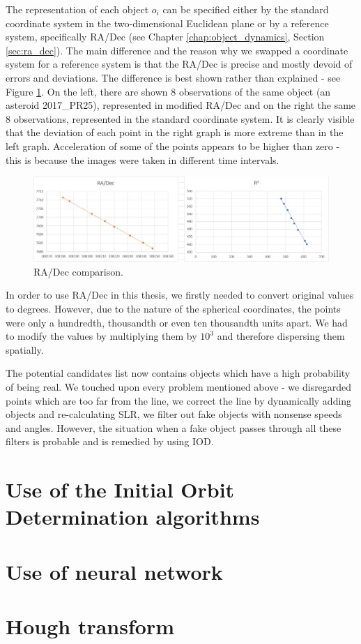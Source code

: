 	The representation of each object $o_i$ can be specified either by the standard coordinate system in the two-dimensional Euclidean plane or by a reference system, specifically RA/Dec (see Chapter \ref{chap:object_dynamics}, Section \ref{sec:ra_dec}). The main difference and the reason why we swapped  a coordinate system for a reference system is that the RA/Dec is precise and mostly devoid of errors and deviations. The difference is best shown rather than explained - see Figure \ref{fig:regresia3}. On the left, there are shown 8 observations of the same object (an asteroid 2017\_PR25), represented in modified RA/Dec and on the right the same 8 observations, represented in the standard coordinate system. It is clearly visible that the deviation of each point in the right graph is more extreme than in the left graph. Acceleration of some of the points appears to be higher than zero - this is because the images were taken in different time intervals.
	
	\begin{figure}[H]
	\centering
	  \includegraphics[width=12cm]{images/regresia3}
		  \caption{RA/Dec comparison.}
	  \label{fig:regresia3}
	\end{figure}
	
	In order to use RA/Dec in this thesis, we firstly needed to convert original values to degrees. However, due to the nature of the spherical coordinates, the points were only a hundredth, thousandth or even ten thousandth units apart. We had to modify the values by multiplying them by $10^3$ and therefore dispersing them spatially.
	
	The potential candidates list now contains objects which have a high probability of being real. We touched upon every problem mentioned above - we disregarded points which are too far from the line, we correct the line by dynamically adding objects and re-calculating SLR, we filter out fake objects with nonsense speeds and angles. However, the situation when a fake object passes through all these filters is probable and is remedied by using IOD.

\section{Use of the Initial Orbit Determination algorithms}\label{sec:IDO}

\section{Use of neural network}\label{sec:neural}

\section{Hough transform}\label{sec:hough}